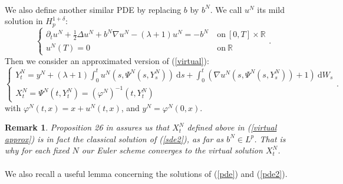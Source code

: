\documentclass[11pt]{article}
\newtheorem{rem}{Remark}
\newcommand{\R}{\mathbb{R}}
\newcommand{\di}{\mathrm{d}}
\begin{document}
        \paragraph{}
        We also define another similar PDE by replacing $b$ by $b^N$. We call $u^N$ its mild solution in $H_p^{1+\delta}$:
        \begin{equation}\label{pde2}
        \begin{cases}
        \partial_t u^N + \frac{1}{2}\Delta u^N + b^N\nabla u^N - (\lambda+1)u^N = -b^N\ &\mathrm{on}\ [0,T]\times\R\\
        u^N(T) = 0\ &\mathrm{on}\ \R
        \end{cases}.
        \end{equation}
        Then we consider an approximated version of (\ref{virtual}): \begin{equation}\label{virtual approx}
        \begin{cases}
        Y_t^N = y^N + (\lambda+1)\int_0^t u^N\left(s,\Psi^N\left(s,Y_s^N\right)\right)\ \di s +\int_0^t \left(\nabla u^N\left(s,\Psi^N\left(s,Y_s^N\right)\right)+1\right)\ \di W_s\\
        X_t^N = \Psi^N(t,Y_t^N) = {(\varphi^N)}^{-1}(t,Y_t^N)
        \end{cases}.
        \end{equation}
        with $\varphi^N(t,x) = x + u^N(t,x)$, and $y^N=\varphi^N(0,x)$.
        
        \begin{rem}
            Proposition 26 in \cite{Fla-Iss-Rus-2017} assures us that $X^N_t$ defined above in (\ref{virtual approx}) is in fact the classical solution of (\ref{sde2}), as far as $b^N\in L^p$. That is why for each fixed $N$ our Euler scheme converges to the virtual solution $X^N_t$.
        \end{rem}
    
    \paragraph{}              
    We also recall a useful lemma concerning the solutions of (\ref{pde}) and (\ref{pde2}).
    
\end{document}
